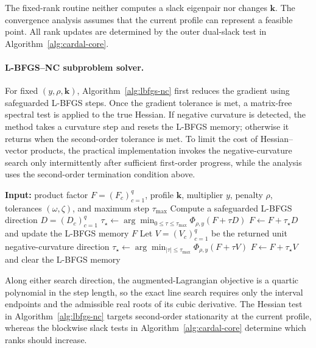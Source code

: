 \documentclass[11pt]{article}
\theoremstyle{definition}
\theoremstyle{remark}
\begin{document}
The fixed-rank routine neither computes a slack eigenpair nor changes
$\mathbf k$.  The convergence analysis assumes that the current profile can
represent a feasible point.  All rank updates are determined by the
outer dual-slack test in Algorithm~\ref{alg:cardal-core}.

\paragraph{L-BFGS--NC subproblem solver.}
For fixed $(y,\rho,\mathbf k)$, Algorithm~\ref{alg:lbfgs-nc} first reduces the
gradient using safeguarded L-BFGS steps.  Once the gradient tolerance is met,
a matrix-free spectral test is applied to the true Hessian.  If negative
curvature is detected, the method takes a curvature step and resets the
L-BFGS memory; otherwise it returns when the second-order tolerance is met.
To limit the cost of Hessian--vector products, the practical implementation
invokes the negative-curvature search only intermittently after sufficient
first-order progress, while the analysis uses the second-order termination
condition above.

\begin{algorithm}[H]
\caption{L-BFGS--NC for one augmented-Lagrangian subproblem}
\label{alg:lbfgs-nc}
\begin{algorithmic}[1]
\State \textbf{Input:} product factor $F=(F_c)_{c=1}^q$, profile $\mathbf k$,
multiplier $y$, penalty $\rho$, tolerances $(\omega,\zeta)$, and maximum step
$\tau_{\max}$
\Loop
    \State Compute a safeguarded L-BFGS direction $D=(D_c)_{c=1}^q$
    \State $\tau_\star\gets
      \arg\min_{0\leq\tau\leq\tau_{\max}}
      \Phi_{\rho,y}(F+\tau D)$
    \State $F\gets F+\tau_\star D$ and update the L-BFGS memory
  \EndWhile
    \State \Return $F$
  \EndIf
  \State Let $V=(V_c)_{c=1}^q$ be the returned unit
    negative-curvature direction
  \State $\tau_\star\gets
    \arg\min_{|\tau|\leq\tau_{\max}}
    \Phi_{\rho,y}(F+\tau V)$
  \State $F\gets F+\tau_\star V$ and clear the L-BFGS memory
\EndLoop
\end{algorithmic}
\end{algorithm}

Along either search direction, the augmented-Lagrangian objective is a
quartic polynomial in the step length, so the exact line search requires only
the interval endpoints and the admissible real roots of its cubic derivative.
The Hessian test in Algorithm~\ref{alg:lbfgs-nc} targets second-order
stationarity at the current profile, whereas the blockwise slack tests in
Algorithm~\ref{alg:cardal-core} determine which ranks should increase.
\end{document}
